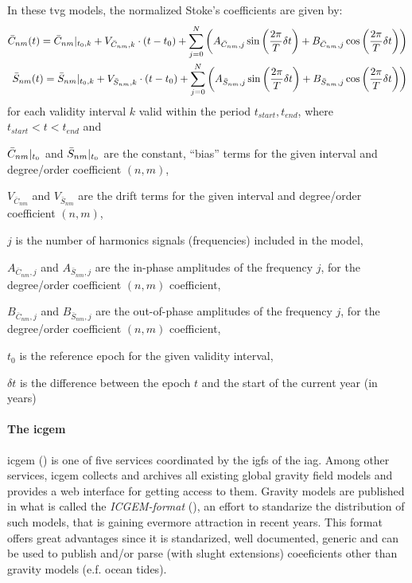 In these \gls{tvg} models, the normalized Stoke's coefficients are given by:
\begin{equation}\label{eq:tvg-stokes}
  \begin{aligned}
    \bar{C}_{nm} (t) = \bar{C}_{nm}|_{t_0,k} + V_{\bar{C}_{nm},k} \cdot (t-t_0) + 
      \sum_{j=0}^{N} \left( A_{\bar{C}_{nm},j} \sin \left( \frac{2\pi}{T} \delta t \right)
      + B_{\bar{C}_{nm},j} \cos \left( \frac{2\pi}{T} \delta t \right) \right) \\
    \bar{S}_{nm} (t) = \bar{S}_{nm}|_{t_0,k} + V_{\bar{S}_{nm},k} \cdot (t-t_0) + 
      \sum_{j=0}^{N} \left( A_{\bar{S}_{nm},j} \sin \left( \frac{2\pi}{T} \delta t \right)
      + B_{\bar{S}_{nm},j} \cos \left( \frac{2\pi}{T} \delta t \right) \right)
  \end{aligned}
\end{equation}
for each validity interval $k$ valid within the period $t_{start}, t_{end}$, 
where $t_{start} < t < t_{end}$ and
\begin{description}
  \item $\bar{C}_{nm}|_{t_0}$ and $\bar{S}_{nm}|_{t_0}$ are the constant, ``bias'' 
    terms for the given interval and degree/order coefficient $(n,m)$,
  \item $V_{\bar{C}_{nm}}$ and $V_{\bar{S}_{nm}}$ are the drift terms for the 
    given interval and degree/order coefficient $(n,m)$,
  \item $j$ is the number of harmonics signals (frequencies) included in the model,
  \item $A_{\bar{C}_{nm},j}$ and $A_{\bar{S}_{nm},j}$ are the in-phase amplitudes of 
    the frequency $j$, for the degree/order coefficient $(n,m)$ coefficient,
  \item $B_{\bar{C}_{nm},j}$ and $B_{\bar{S}_{nm},j}$ are the out-of-phase amplitudes of 
    the frequency $j$, for the degree/order coefficient $(n,m)$ coefficient,
  \item $t_0$ is the reference epoch for the given validity interval,
  \item $\delta t$ is the difference between the epoch $t$ and the start of the 
    current year (in years)
\end{description}

\paragraph{The \gls{icgem}}\label{par:icgem}
\gls{icgem} (\cite{icgempub}) is one of five services coordinated by the 
\gls{igfs} of the \gls{iag}. Among other services, \gls{icgem} collects and 
archives all existing global gravity field models and provides a web interface 
for getting access to them.
Gravity models are published in what is called the \emph{ICGEM-format} 
(\cite{ICGEMFormat}), an effort to standarize the distribution of such models, 
that is gaining evermore attraction in recent years. This format offers great 
advantages since it is standarized, well documented, generic and can be used to 
publish and/or parse (with slught extensions) coeeficients other than gravity 
models (e.f. ocean tides).

